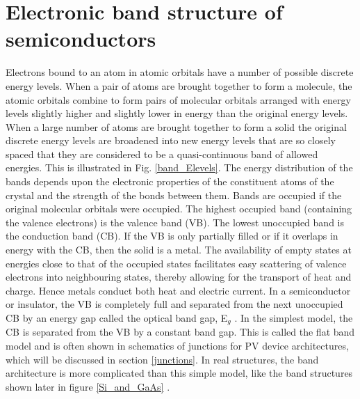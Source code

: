 \documentclass[11pt, twoside]{report}
\begin{document}
\section{Electronic band structure of semiconductors}\label{BandTheorySection}
Electrons bound to an atom in atomic orbitals have a number of possible discrete energy levels. When a pair of atoms are brought together to form a molecule, the atomic orbitals combine to form pairs of molecular orbitals arranged with energy levels slightly higher and slightly lower in energy than the original energy levels. When a large number of atoms are brought together to form a solid the 
original discrete energy levels are broadened into new energy levels that are so closely spaced that they are considered to be a quasi-continuous band of allowed energies. This is illustrated in Fig. \ref{band_Elevels}. The energy distribution of the bands depends upon the electronic properties of the constituent atoms of the crystal and the strength of the bonds between them. Bands are occupied if the original molecular orbitals were occupied. The highest occupied band (containing the valence electrons) is the valence band (VB). The lowest unoccupied band is the conduction band (CB). If the VB is only partially filled or if it overlaps in energy with the CB, then the solid is a metal. The availability of empty states at energies close to that of the occupied states facilitates easy scattering of valence electrons into neighbouring states, thereby allowing for the transport of heat and charge. Hence metals conduct both heat and electric current. In a semiconductor or insulator, the VB is completely full and separated from the next unoccupied CB by an energy gap called the optical band gap, E$_g$ \cite{Nelson3}. In the simplest model, the CB is separated from the VB by a constant band gap. This is called the flat band model and is often shown in schematics of junctions for PV device architectures, which will be discussed in section \ref{junctions}. In real structures, the band architecture is more complicated than this simple model, like the band structures shown later in figure \ref{Si_and_GaAs} \cite{Tilley}.
\end{document}
